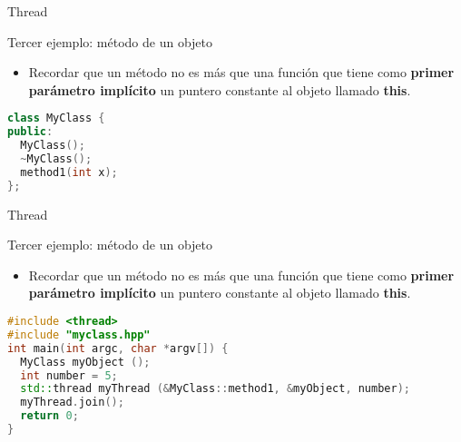 
\begin{frame}[fragile]{Thread}
\begin{block}{Tercer ejemplo: método de un objeto}
\begin{itemize}
  \item Recordar que un método no es más que una función que tiene como \textbf{primer parámetro implícito} un puntero constante al objeto llamado \textbf{this}.
\end{itemize}
\begin{lstlisting}[language=C++, basicstyle=\small]
class MyClass {
public:
  MyClass();
  ~MyClass();
  method1(int x);
};
\end{lstlisting}
\end{block}
\end{frame}

\begin{frame}[fragile]{Thread}
\begin{block}{Tercer ejemplo: método de un objeto}
\begin{itemize}
  \item Recordar que un método no es más que una función que tiene como \textbf{primer parámetro implícito} un puntero constante al objeto llamado \textbf{this}.
\end{itemize}
\begin{lstlisting}[language=C++, basicstyle=\small]
#include <thread>
#include "myclass.hpp"
int main(int argc, char *argv[]) {
  MyClass myObject ();
  int number = 5;
  std::thread myThread (&MyClass::method1, &myObject, number);
  myThread.join();
  return 0;
}
\end{lstlisting}
\end{block}
\end{frame}

